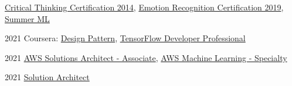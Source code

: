 

\begin{highlights}
	
	\item {
		\begin{onecolentry}
			\href{https://hmthanh.github.io/img/Critical_Thinking.jpg}{Critical Thinking Certification 2014}, \href{https://hmthanh.github.io/img/Emotion_Regconition.jpg}{Emotion Recognition Certification 2019}, \href{https://hmthanh.github.io/img/ml_summer.jpg}{Summer ML}
		\end{onecolentry}
	}
	
	\item {
		\begin{twocolentry}{2021}
			Coursera: \href{https://www.coursera.org/account/accomplishments/certificate/28JLEX5NNNUQ}{Design Pattern},
			\href{https://www.coursera.org/account/accomplishments/professional-cert/Q2B26F8Q84MZ}{TensorFlow Developer Professional}
		\end{twocolentry}
	}
	
	\item {
		\begin{twocolentry}{2021}
			\href{https://www.credly.com/badges/8e0316a5-2463-4d8c-aa34-76a2f6a0c1c3}{AWS Solutions Architect - Associate},  	\href{https://www.credly.com/badges/972d23a2-e63f-4125-aebd-2d2c696f840e}{AWS Machine Learning - Specialty}
		\end{twocolentry}
	}
	
	\item {
		\begin{twocolentry}{2021}
			\href{https://hmthanh.github.io/img/fpt_solution_architect_2021.png}{Solution Architect}
		\end{twocolentry}
	}
	
	
\end{highlights}

